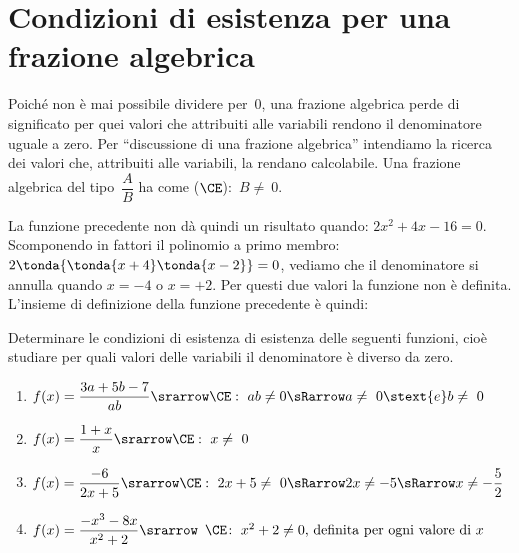\section{Condizioni di esistenza per una frazione algebrica}
\label{sec:frazalg_condizioniesistenza}

Poiché non è mai possibile dividere per~\(0\), una frazione algebrica 
perde di significato per quei valori che attribuiti alle variabili 
rendono il denominatore uguale a zero. 
Per ``discussione di una frazione algebrica'' intendiamo la ricerca dei 
valori che, attribuiti alle variabili, la rendano calcolabile. 
Una frazione algebrica del tipo~\(\dfrac{A}{B}\) ha come 
 (\(\CE\)):~\(B\neq~0\).

La funzione precedente non dà quindi un risultato quando: 
\(2x^2 +4x -16=0\).
Scomponendo in fattori il polinomio a primo membro: 
\(2 \tonda{\tonda{x+4}\tonda{x-2}}=0\),
vediamo che il denominatore si annulla quando \(x=-4\) o \(x=+2\).
Per questi due valori la funzione non è definita.
L'insieme di definizione della funzione precedente è quindi: 


\begin{esempio}{}{}
Determinare le condizioni di esistenza di esistenza delle seguenti 
funzioni, cioè studiare per quali valori delle variabili il denominatore 
è diverso da zero.

\begin{enumerate} [left=0mm]
\item \(f(x)=\dfrac{3a+5b-7}{ab} \srarrow 
\CE:~ ab \neq 0 \sRarrow a\neq~0 \stext{e} b\neq~0\)
\item \(f(x)=\dfrac{1+x}{x} \srarrow \CE:~ x\neq~0\)
\item \(f(x)=\dfrac{-6}{2x+5} \srarrow 
\CE:~ 2x+5\neq~0 \sRarrow 2x \neq -5 \sRarrow x\neq -\dfrac{5}{2}\)
\item \(f(x)=\dfrac{-x^{3}-8x}{x^{2}+2} \srarrow 
\begin{array}{l}\CE\!:~ x^{2}+2 \neq 0 
\text{, definita per ogni valore di } x
\end{array}\)
\end{enumerate}
\end{esempio}

